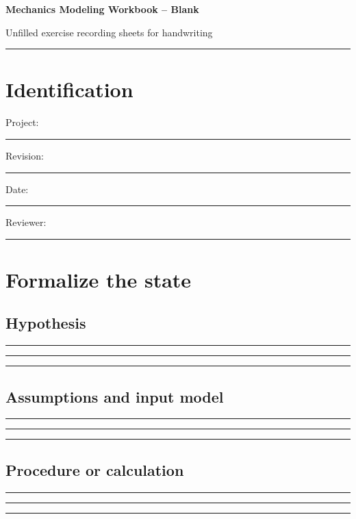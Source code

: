 \documentclass[11pt]{article}
\begin{document}
{\huge\bfseries\color{suiteblue} Mechanics Modeling Workbook -- Blank}\par
\vspace{0.15in}
{\normalsize\color{suitegray} Unfilled exercise recording sheets for handwriting}\par
\vspace{0.15in}\hrule\vspace{0.15in}

\section{Identification}
Project: \rule{0.70\linewidth}{0.4pt}\par\vspace{0.25in}
Revision: \rule{0.36\linewidth}{0.4pt}\hfill Date: \rule{0.26\linewidth}{0.4pt}\par\vspace{0.25in}
Reviewer: \rule{0.67\linewidth}{0.4pt}\par
\clearpage

\section{Formalize the state}

\subsection{Hypothesis}
\noindent\rule{\linewidth}{0.35pt}\par\vspace{0.22in}
\noindent\rule{\linewidth}{0.35pt}\par\vspace{0.22in}
\noindent\rule{\linewidth}{0.35pt}\par\vspace{0.18in}

\subsection{Assumptions and input model}
\noindent\rule{\linewidth}{0.35pt}\par\vspace{0.22in}
\noindent\rule{\linewidth}{0.35pt}\par\vspace{0.22in}
\noindent\rule{\linewidth}{0.35pt}\par\vspace{0.18in}

\subsection{Procedure or calculation}
\noindent\rule{\linewidth}{0.35pt}\par\vspace{0.22in}
\noindent\rule{\linewidth}{0.35pt}\par\vspace{0.22in}
\noindent\rule{\linewidth}{0.35pt}\par\vspace{0.18in}
\end{document}
